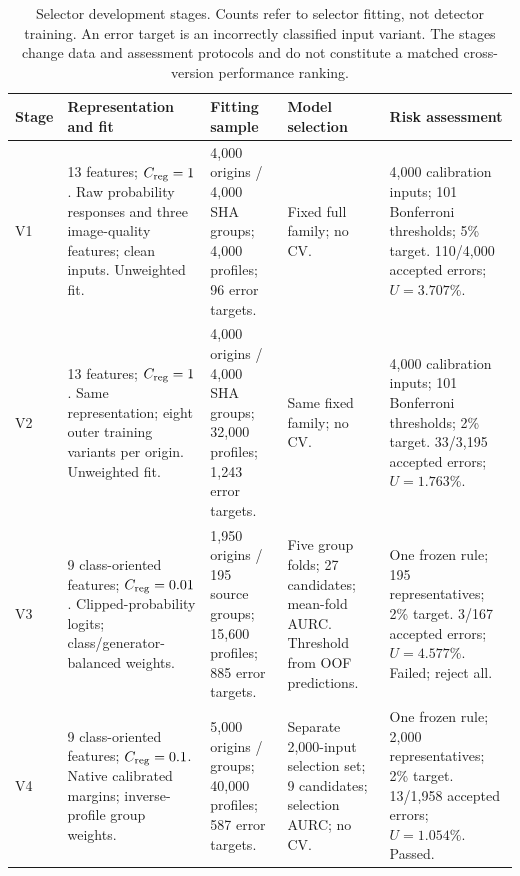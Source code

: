 \begin{table}[t]
\caption{Selector development stages. Counts refer to selector fitting, not detector training. An error target is an incorrectly classified input variant. The stages change data and assessment protocols and do not constitute a matched cross-version performance ranking.}
\label{tab:selector_evolution}
\centering
\begingroup
\fontsize{8}{9.6}\selectfont
\setlength{\tabcolsep}{3pt}
\renewcommand{\arraystretch}{1.12}
\begin{tabular}{@{}p{0.30in}p{1.72in}p{1.27in}p{1.40in}p{1.90in}@{}}
\toprule
Stage & Representation and fit & Fitting sample & Model selection & Risk assessment \\
\midrule
V1 & 13 features; $C_{\rm reg}=1$. Raw probability responses and three image-quality features; clean inputs. Unweighted fit. & 4,000 origins / 4,000 SHA groups; 4,000 profiles; 96 error targets. & Fixed full family; no CV. & 4,000 calibration inputs; 101 Bonferroni thresholds; 5\% target. 110/4,000 accepted errors; $U=3.707\%$. \\
\addlinespace[2pt]
V2 & 13 features; $C_{\rm reg}=1$. Same representation; eight outer training variants per origin. Unweighted fit. & 4,000 origins / 4,000 SHA groups; 32,000 profiles; 1,243 error targets. & Same fixed family; no CV. & 4,000 calibration inputs; 101 Bonferroni thresholds; 2\% target. 33/3,195 accepted errors; $U=1.763\%$. \\
\addlinespace[2pt]
V3 & 9 class-oriented features; $C_{\rm reg}=0.01$. Clipped-probability logits; class/generator-balanced weights. & 1,950 origins / 195 source groups; 15,600 profiles; 885 error targets. & Five group folds; 27 candidates; mean-fold AURC. Threshold from OOF predictions. & One frozen rule; 195 representatives; 2\% target. 3/167 accepted errors; $U=4.577\%$. Failed; reject all. \\
\addlinespace[2pt]
V4 & 9 class-oriented features; $C_{\rm reg}=0.1$. Native calibrated margins; inverse-profile group weights. & 5,000 origins / groups; 40,000 profiles; 587 error targets. & Separate 2,000-input selection set; 9 candidates; selection AURC; no CV. & One frozen rule; 2,000 representatives; 2\% target. 13/1,958 accepted errors; $U=1.054\%$. Passed. \\
\bottomrule
\end{tabular}
\endgroup
\end{table}
